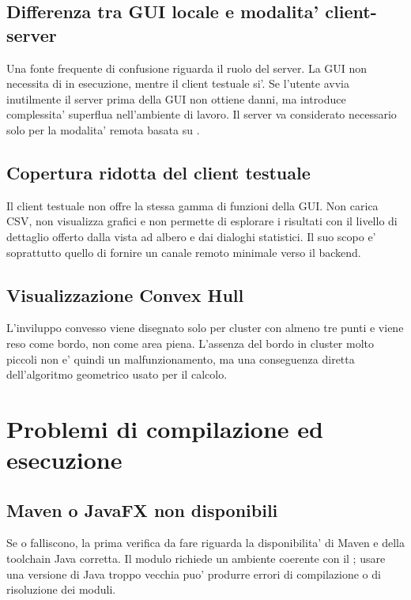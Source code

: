 \subsection{Differenza tra GUI locale e modalita' client-server}

Una fonte frequente di confusione riguarda il ruolo del server. La GUI non necessita di
 in esecuzione, mentre il client testuale si'. Se l'utente avvia
inutilmente il server prima della GUI non ottiene danni, ma introduce complessita'
superflua nell'ambiente di lavoro. Il server va considerato necessario solo per la
modalita' remota basata su .

\subsection{Copertura ridotta del client testuale}

Il client testuale non offre la stessa gamma di funzioni della GUI. Non carica CSV, non
visualizza grafici e non permette di esplorare i risultati con il livello di dettaglio
offerto dalla vista ad albero e dai dialoghi statistici. Il suo scopo e' soprattutto
quello di fornire un canale remoto minimale verso il backend.

\subsection{Visualizzazione Convex Hull}

L'inviluppo convesso viene disegnato solo per cluster con almeno tre punti e viene reso
come bordo, non come area piena. L'assenza del bordo in cluster molto piccoli non e'
quindi un malfunzionamento, ma una conseguenza diretta dell'algoritmo geometrico usato
per il calcolo.

\section{Problemi di compilazione ed esecuzione}

\subsection{Maven o JavaFX non disponibili}

Se  o  falliscono, la prima verifica da fare
riguarda la disponibilita' di Maven e della toolchain Java corretta. Il modulo
 richiede un ambiente coerente con il ; usare una versione
di Java troppo vecchia puo' produrre errori di compilazione o di risoluzione dei moduli.

